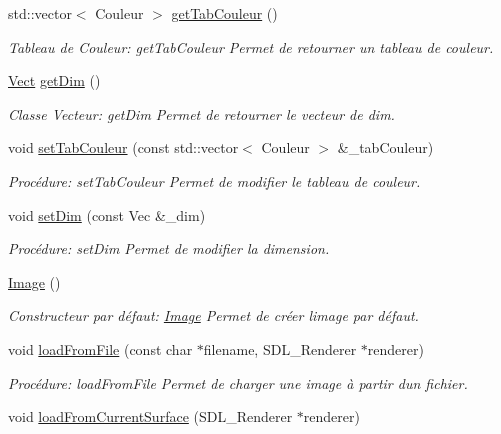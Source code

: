 \begin{DoxyCompactItemize}
std\+::vector$<$ Couleur $>$ \hyperlink{classImage_a61a9499054fb7982ca74f7e408617df5}{get\+Tab\+Couleur} ()
\begin{DoxyCompactList}\small\item\em Tableau de Couleur\+: get\+Tab\+Couleur Permet de retourner un tableau de couleur. \end{DoxyCompactList}\item 
\hyperlink{classVect}{Vect} \hyperlink{classImage_a19886e6e2f661123224101aebdab0659}{get\+Dim} ()
\begin{DoxyCompactList}\small\item\em Classe Vecteur\+: get\+Dim Permet de retourner le vecteur de dim. \end{DoxyCompactList}\item 
void \hyperlink{classImage_a17feecebcbde65970ffa419ba9f0465a}{set\+Tab\+Couleur} (const std\+::vector$<$ Couleur $>$ \&\+\_\+tab\+Couleur)
\begin{DoxyCompactList}\small\item\em Procédure\+: set\+Tab\+Couleur Permet de modifier le tableau de couleur. \end{DoxyCompactList}\item 
void \hyperlink{classImage_a9561b601b84ece813a9b87b881b8fc24}{set\+Dim} (const Vec \&\+\_\+dim)
\begin{DoxyCompactList}\small\item\em Procédure\+: set\+Dim Permet de modifier la dimension. \end{DoxyCompactList}\item 
\hyperlink{classImage_a58edd1c45b4faeb5f789b0d036d02313}{Image} ()
\begin{DoxyCompactList}\small\item\em Constructeur par défaut\+: \hyperlink{classImage}{Image} Permet de créer l\textquotesingle{}image par défaut. \end{DoxyCompactList}\item 
void \hyperlink{classImage_aa276b5183099671ddeaf8f083068046c}{load\+From\+File} (const char $\ast$filename, S\+D\+L\+\_\+\+Renderer $\ast$renderer)
\begin{DoxyCompactList}\small\item\em Procédure\+: load\+From\+File Permet de charger une image à partir d\textquotesingle{}un fichier. \end{DoxyCompactList}\item 
void \hyperlink{classImage_aee71e67e123b6fdd1d3c91caa2892792}{load\+From\+Current\+Surface} (S\+D\+L\+\_\+\+Renderer $\ast$renderer)

\end{DoxyCompactItemize}
